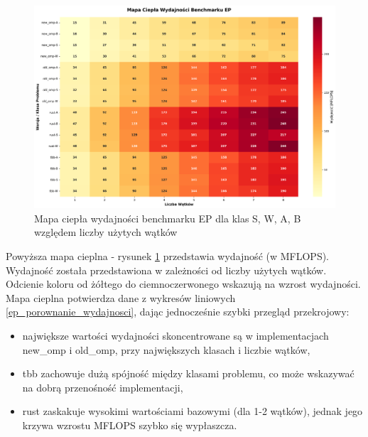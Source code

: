 \begin{figure}[H]
    \centering
    \includegraphics[width=\textwidth]{analiza/images/parallel/ep/ep_mapa_ciepla_wydajnosci.png}
    \caption{Mapa ciepła wydajności benchmarku EP dla klas S, W, A, B względem liczby użytych wątków}
    \label{ep_heatmap_wydajnosci}
\end{figure}
Powyższa mapa cieplna - rysunek \ref{ep_heatmap_wydajnosci} przedstawia wydajność (w MFLOPS). Wydajność została przedstawiona w zależności od liczby użytych wątków. Odcienie koloru od żółtego do ciemnoczerwonego wskazują na wzrost wydajności.
Mapa cieplna potwierdza dane z wykresów liniowych \ref{ep_porownanie_wydajnosci}, dając jednocześnie szybki przegląd przekrojowy:
\begin{itemize}
    \item największe wartości wydajności skoncentrowane są w implementacjach new\_omp i old\_omp, przy największych klasach i liczbie wątków,
    \item tbb zachowuje dużą spójność między klasami problemu, co może wskazywać na dobrą przenośność implementacji,
    \item rust zaskakuje wysokimi wartościami bazowymi (dla 1-2 wątków), jednak jego krzywa wzrostu MFLOPS szybko się wypłaszcza.
\end{itemize}





